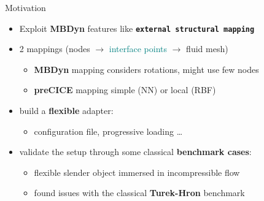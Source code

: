 \documentclass[10pt,t]{beamer}
\begin{document}
\begin{frame}{Motivation}

    
    
    \begin{itemize}
        \item Exploit \textcolor{dorange}{\textbf{MBDyn}} features like \textbf{\texttt{external structural mapping}}
        
        \vspace{2mm}
        
        \item 2 mappings (\textcolor{dorange}{nodes} $\to$ \textcolor{teal}{interface points} $\to$ \textcolor{dblue}{fluid mesh})
        \begin{itemize}
        \vspace{1mm}
            \item \textcolor{dorange}{\textbf{MBDyn}} mapping considers rotations, might use few nodes
            \vspace{1mm}
            \item \textcolor{pblue}{\textbf{preCICE}} mapping simple (NN) or local (RBF)
        \end{itemize}

        \vspace{2mm}
        
        \pause
        
        \item build a \textbf{flexible} adapter:
        
        \begin{itemize}
            \item configuration file, progressive loading \ldots
        \end{itemize}
        
        \vspace{2mm}
        
        \pause
        
        \item validate the setup through some classical \textbf{benchmark cases}:
        
        \begin{itemize}
            \item flexible slender object immersed in incompressible flow
            \item found issues with the classical \textbf{Turek-Hron} benchmark
        \end{itemize}
        

\end{itemize}
\end{frame}
\end{document}
